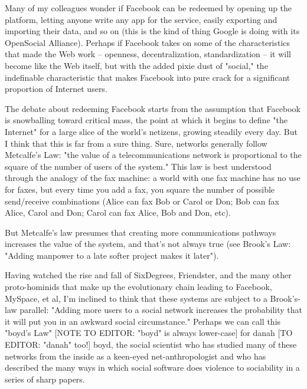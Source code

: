 Many of my colleagues wonder if Facebook can be redeemed by opening
up the platform, letting anyone write any app for the service,
easily exporting and importing their data, and so on (this is the
kind of thing Google is doing with its OpenSocial Alliance).
Perhaps if Facebook takes on some of the characteristics that made
the Web work -- openness, decentralization, standardization -- it
will become like the Web itself, but with the added pixie dust of
"social," the indefinable characteristic that makes Facebook into
pure crack for a significant proportion of Internet users.

The debate about redeeming Facebook starts from the assumption that
Facebook is snowballing toward critical mass, the point at which it
begins to define "the Internet" for a large slice of the world's
netizens, growing steadily every day. But I think that this is far
from a sure thing. Sure, networks generally follow Metcalfe's Law:
"the value of a telecommunications network is proportional to the
square of the number of users of the system." This law is best
understood through the analogy of the fax machine: a world with one
fax machine has no use for faxes, but every time you add a fax, you
square the number of possible send/receive combinations (Alice can
fax Bob or Carol or Don; Bob can fax Alice, Carol and Don; Carol
can fax Alice, Bob and Don, etc).

But Metcalfe's law presumes that creating more communications
pathways increases the value of the system, and that's not always
true (see Brook's Law: "Adding manpower to a late softer project
makes it later").

Having watched the rise and fall of SixDegrees, Friendster, and the
many other proto-hominids that make up the evolutionary chain
leading to Facebook, MySpace, et al, I'm inclined to think that
these systems are subject to a Brook's-law parallel: "Adding more
users to a social network increases the probability that it will
put you in an awkward social circumstance." Perhaps we can call
this "boyd's Law" [NOTE TO EDITOR: "boyd" is always lower-case] for
danah [TO EDITOR: "danah" too!] boyd, the social scientist who has
studied many of these networks from the inside as a keen-eyed
net-anthropologist and who has described the many ways in which
social software does violence to sociability in a series of sharp
papers.

